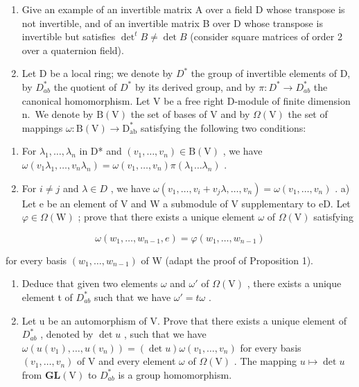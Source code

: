 
\begin{enumerate}
\def\labelenumi{\arabic{enumi})}
\item
  Give an example of an invertible matrix A over a field D whose transpose is not invertible, and of an invertible matrix B over D whose transpose is invertible but satisfies \(\det^{t}B \neq \det B\) (consider square matrices of order 2 over a quaternion field).
\item
  Let D be a local ring; we denote by \(D^{*}\) the group of invertible elements of D, by \(D_{ab}^{*}\) the quotient of \(D^{*}\) by its derived group, and by \(\pi : D^{*} \to D_{ab}^{*}\) the canonical homomorphism. Let V be a free right D-module of finite dimension n.~We denote by \(\mathrm{B(V)}\) the set of bases of V and by \(\Omega(\mathrm{V})\) the set of mappings \(\omega : \mathrm{B(V)} \to \mathrm{D}_{\mathrm{ab}}^{*}\) satisfying the following two conditions:
\end{enumerate}

\begin{enumerate}
\def\labelenumi{(\roman{enumi})}
\item
  For \(\lambda_1, \ldots, \lambda_n\) in D* and \((v_1, \ldots, v_n) \in \mathrm{B}(\mathrm{V})\) , we have \(\omega(v_1 \lambda_1, \ldots, v_n \lambda_n) = \omega(v_1, \ldots, v_n)\pi(\lambda_1 \ldots \lambda_n)\) .
\item
  For \(i \neq j\) and \(\lambda \in D\) , we have \(\omega(v_{1},\ldots,v_{i}+v_{j}\lambda,\ldots,v_{n}) = \omega(v_{1},\ldots,v_{n})\) . a) Let e be an element of V and W a submodule of V supplementary to eD. Let \(\varphi \in \Omega(\mathrm{W})\) ; prove that there exists a unique element \(\omega\) of \(\Omega(\mathrm{V})\) satisfying
\end{enumerate}

\[
\omega (w _ {1}, \dots , w _ {n - 1}, e) = \varphi (w _ {1}, \dots , w _ {n - 1})
\]

for every basis \((w_{1},\ldots ,w_{n - 1})\) of W (adapt the proof of Proposition 1).

\begin{enumerate}
\def\labelenumi{\alph{enumi})}
\setcounter{enumi}{1}
\item
  Deduce that given two elements \(\omega\) and \(\omega'\) of \(\Omega(\mathrm{V})\) , there exists a unique element t of \(D_{ab}^{*}\) such that we have \(\omega' = t\omega\) .
\item
  Let u be an automorphism of V. Prove that there exists a unique element of \(D_{ab}^{*}\) , denoted by \(\det u\) , such that we have \(\omega(u(v_{1}),\ldots,u(v_{n}))=(\det u)\omega(v_{1},\ldots,v_{n})\) for every basis \((v_{1},\ldots,v_{n})\) of V and every element \(\omega\) of \(\Omega(\mathrm{V})\) . The mapping \(u\mapsto\det u\) from \(\mathbf{GL}(\mathrm{V})\) to \(D_{ab}^{*}\) is a group homomorphism.
\end{enumerate}


